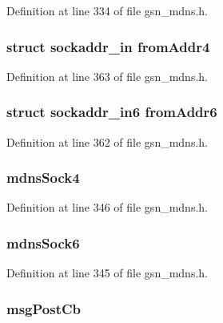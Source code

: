 Definition at line 334 of file gsn\_\-mdns.h.

\hypertarget{a00140_adef8b394e1fd1701cf1f63d24339e665}{
\subsubsection[{fromAddr4}]{\setlength{\rightskip}{0pt plus 5cm}struct sockaddr\_\-in {\bf fromAddr4}}}
\label{a00140_adef8b394e1fd1701cf1f63d24339e665}


Definition at line 363 of file gsn\_\-mdns.h.

\hypertarget{a00140_a57fce45abb176348c2c580b064621a65}{
\subsubsection[{fromAddr6}]{\setlength{\rightskip}{0pt plus 5cm}struct sockaddr\_\-in6 {\bf fromAddr6}}}
\label{a00140_a57fce45abb176348c2c580b064621a65}


Definition at line 362 of file gsn\_\-mdns.h.

\hypertarget{a00140_aab3ddd12f9ecd58385cb87b01cd0f436}{
\subsubsection[{mdnsSock4}]{ {\bf mdnsSock4}}}
\label{a00140_aab3ddd12f9ecd58385cb87b01cd0f436}


Definition at line 346 of file gsn\_\-mdns.h.

\hypertarget{a00140_aebd7988998f79a395deb1e0738c0c3b3}{
\subsubsection[{mdnsSock6}]{ {\bf mdnsSock6}}}
\label{a00140_aebd7988998f79a395deb1e0738c0c3b3}


Definition at line 345 of file gsn\_\-mdns.h.

\hypertarget{a00140_a6adb3a11c7d8acfbd87e34dca64c8117}{
\subsubsection[{msgPostCb}]{ {\bf msgPostCb}}}
\label{a00140_a6adb3a11c7d8acfbd87e34dca64c8117}


